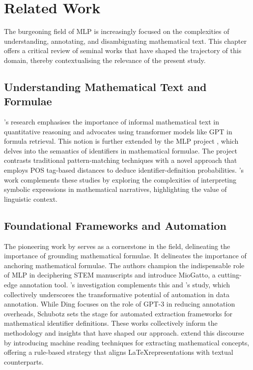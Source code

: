 \chapter{Related Work}\label{chapter:related_work}

The burgeoning field of \ac{MLP} is increasingly focused on the complexities of understanding, annotating, and disambiguating mathematical text. This chapter offers a critical review of seminal works that have shaped the trajectory of this domain, thereby contextualising the relevance of the present study.

\section{Understanding Mathematical Text and Formulae}

\citet{meadows2022survey}'s research emphasises the importance of informal mathematical text in quantitative reasoning and advocates using transformer models like GPT in formula retrieval. This notion is further extended by the \ac{MLP} project \citep{pagael2014mathematical}, which delves into the semantics of identifiers in mathematical formulae. The project contrasts traditional pattern-matching techniques with a novel approach that employs \ac{POS} tag-based distances to deduce identifier-definition probabilities. \citet{grigore2009towards}'s work complements these studies by exploring the complexities of interpreting symbolic expressions in mathematical narratives, highlighting the value of linguistic context.

\section{Foundational Frameworks and Automation}

The pioneering work by \citet{asakura2020towards} serves as a cornerstone in the field, delineating the importance of grounding mathematical formulae. It delineates the importance of anchoring mathematical formulae. The authors champion the indispensable role of MLP in deciphering STEM manuscripts and introduce MioGatto, a cutting-edge annotation tool. \citet{ding2022gpt}'s investigation complements this and \citet{schubotz2017evaluating}'s study, which collectively underscores the transformative potential of automation in data annotation. While Ding focuses on the role of GPT-3 in reducing annotation overheads, Schubotz sets the stage for automated extraction frameworks for mathematical identifier definitions. These works collectively inform the methodology and insights that have shaped our approach. \citet{alexeeva2020mathalign} extend this discourse by introducing machine reading techniques for extracting mathematical concepts, offering a rule-based strategy that aligns \LaTeX \space representations with textual counterparts.


